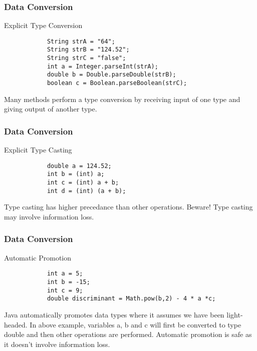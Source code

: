 \documentclass[10pt, compress]{beamer}
\begin{document}
\begin{frame}[fragile]
	\frametitle{Data Conversion}
	\begin{block}{Explicit Type Conversion}
		\begin{verbatim}
			String strA = "64";
			String strB = "124.52";
			String strC = "false";
			int a = Integer.parseInt(strA);
			double b = Double.parseDouble(strB);
			boolean c = Boolean.parseBoolean(strC);
		\end{verbatim}
		Many methods perform a type conversion by receiving input of one type and giving output of another type.
	\end{block}
\end{frame}

\begin{frame}[fragile]
	\frametitle{Data Conversion}
	\begin{block}{Explicit Type Casting}
		\begin{verbatim}
			double a = 124.52;
			int b = (int) a;
			int c = (int) a + b;
			int d = (int) (a + b);
		\end{verbatim}
		Type casting has higher precedance than other operations. Beware! Type casting may involve information loss.
	\end{block}
\end{frame}

\begin{frame}[fragile]
	\frametitle{Data Conversion}
	\begin{block}{Automatic Promotion}
		\begin{verbatim}
			int a = 5;
			int b = -15;
			int c = 9;
			double discriminant = Math.pow(b,2) - 4 * a *c;
		\end{verbatim}
		Java automatically promotes data types where it assumes we have been light-headed. In above example, variables a, b and c will first be converted to type double and then other operations are performed. Automatic promotion is safe as it doesn't involve information loss.
	\end{block}
\end{frame}

\end{document}
